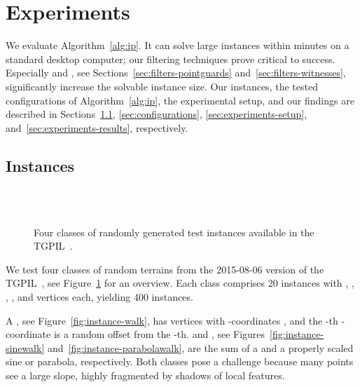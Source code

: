 \section{Experiments}
\label{sec:experiments}

We evaluate Algorithm~\ref{alg:ip}.
It can solve large instances within minutes on a standard desktop computer;
our filtering techniques prove critical to success.
Especially \pointguardfilter and \witnessfilter, see Sections~\ref{sec:filters-pointguards} and~\ref{sec:filters-witnesses}, significantly increase the solvable instance size.
Our instances, the tested configurations of Algorithm~\ref{alg:ip}, the experimental setup, and our findings are described in Sections~\ref{sec:experiments-instance-description}, \ref{sec:configurations}, \ref{sec:experiments-setup}, and~\ref{sec:experiments-results}, respectively.

\subsection{Instances}
\label{sec:experiments-instance-description}

\begin{figure}
	\centering
	 \\
	 \\
	\hspace{.03\linewidth}
	\caption{Four classes of randomly generated test instances available in the \acs{TGPIL}~\cite{tgpil}.}
	\label{fig:instance}
\end{figure}

We test four classes of random terrains from the 2015-08-06 version of the \ac{TGPIL}~\cite{tgpil}, see Figure~\ref{fig:instance} for an overview.
Each class comprises 20 instances with , , , , and  vertices each, yielding 400 instances.

A \walk, see Figure~\ref{fig:instance-walk}, has  vertices with -coordinates , and the -th -coordinate is a random offset from the -th.
\sinewalk and \parabolawalk, see Figures~\ref{fig:instance-sinewalk} and~\ref{fig:instance-parabolawalk}, are the sum of a \walk and a properly scaled sine or parabola, respectively.
Both classes pose a challenge because many points see a large slope, highly fragmented by shadows of local features.

